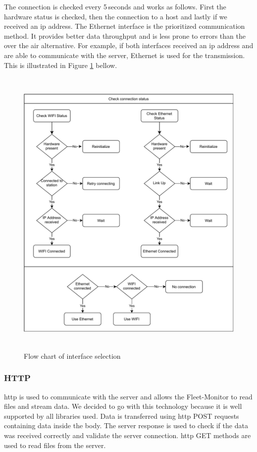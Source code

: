 The connection is checked every 5\,seconds and works as follows. First the hardware status is checked, then the connection to a host and lastly if we received an \acrshort{ip} address. The Ethernet interface is the prioritized communication method. It provides better data throughput and is less prone to errors than the over the air alternative. For example, if both interfaces received an \acrshort{ip} address and are able to communicate with the server, Ethernet is used for the transmission. This is illustrated in Figure \ref{fig:connectin-tree} bellow.
\begin{figure}[!ht]
	\centering
	\includegraphics[height=14.5cm]{images/connection-tree}
	\caption{Flow chart of interface selection}
	\label{fig:connectin-tree}
\end{figure}
\newpage

\subsubsection{HTTP}
\acrfull{http} is used to communicate with the server and allows the Fleet-Monitor to read files and stream data. We decided to go with this technology because it is well supported by all libraries used. Data is transferred using \acrshort{http} POST requests containing data inside the body. The server response is used to check if the data was received correctly and validate the server connection. \acrshort{http} GET methods are used to read files from the server.

